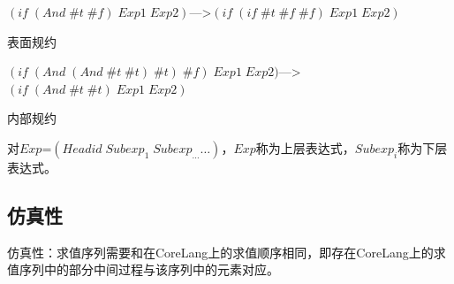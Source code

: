 $(if\; (And\; \#t\; \#f)\; Exp1\; Exp2)$--->$(if\; (if\; \#t\; \#f\; \#f)\; Exp1\; Exp2)$ \begin{flushright}表面规约\end{flushright}

$(if\; (And\; (And\; \#t\; \#t)\; \#t)\; \#f)\; Exp1\; Exp2)$--->$(if\; (And\; \#t\; \#t)\; Exp1\; Exp2)$ \begin{flushright}内部规约\end{flushright}

对$Exp$=$(Headid\;Subexp_{1}\;Subexp_{\ldots} \ldots)$，$Exp$称为上层表达式，$Subexp_{i}$称为下层表达式。

\subsection{仿真性}
仿真性：求值序列需要和在CoreLang上的求值顺序相同，即存在CoreLang上的求值序列中的部分中间过程与该序列中的元素对应。

